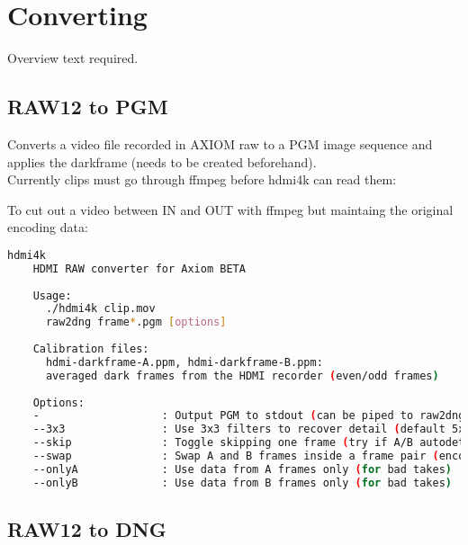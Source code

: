 \section{Converting}

Overview text required.




\subsection{RAW12 to PGM}

Converts a video file recorded in AXIOM raw to a PGM image sequence and applies the darkframe (needs to be created beforehand).\\

Currently clips must go through ffmpeg before hdmi4k can read them:\\ 


To cut out a video between IN and OUT with ffmpeg but maintaing the original encoding data:



\begin{lstlisting}[language=bash,morekeywords=$,keywordstyle=\bfseries,frame=none,xleftmargin=.25in,belowskip=2em, aboveskip=2em]
	hdmi4k
    HDMI RAW converter for Axiom BETA
     
    Usage:
      ./hdmi4k clip.mov
      raw2dng frame*.pgm [options]
     
    Calibration files:
      hdmi-darkframe-A.ppm, hdmi-darkframe-B.ppm:
      averaged dark frames from the HDMI recorder (even/odd frames)
     
    Options:
    -                   : Output PGM to stdout (can be piped to raw2dng)
    --3x3               : Use 3x3 filters to recover detail (default 5x5)
    --skip              : Toggle skipping one frame (try if A/B autodetection fails)
    --swap              : Swap A and B frames inside a frame pair (encoding bug?)
    --onlyA             : Use data from A frames only (for bad takes)
    --onlyB             : Use data from B frames only (for bad takes)
\end{lstlisting}





\subsection{RAW12 to DNG}

